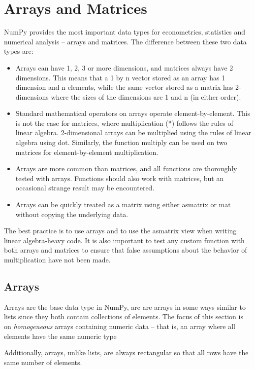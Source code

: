 \documentclass[KSmain.tex]{subfiles}
\begin{document}
 
\section{Arrays and Matrices}
NumPy provides the most important data types for econometrics, statistics and numerical analysis – arrays
and matrices. The difference between these two data types are:
\begin{itemize}
\item Arrays can have 1, 2, 3 or more dimensions, and matrices always have 2 dimensions. This means
that a 1 by n vector stored as an array has 1 dimension and n elements, while the same vector stored
as a matrix has 2-dimensions where the sizes of the dimensions are 1 and n (in either order).
\item  Standard mathematical operators on arrays operate element-by-element. This is not the case for
matrices, where multiplication (*) follows the rules of linear algebra. 2-dimensional arrays can be
multiplied using the rules of linear algebra using dot. Similarly, the function multiply can be used
on two matrices for element-by-element multiplication.
\item  Arrays are more common than matrices, and all functions are thoroughly tested with arrays. Functions
should also work with matrices, but an occasional strange result may be encountered.
\item  Arrays can be quickly treated as a matrix using either asmatrix or mat without copying the underlying
data.
\end{itemize}
The best practice is to use arrays and to use the asmatrix view when writing linear algebra-heavy code. It is
also important to test any custom function with both arrays and matrices to ensure that false assumptions
about the behavior of multiplication have not been made.

\subsection{Arrays}
Arrays are the base data type in NumPy, are are arrays in some ways similar to lists since they both contain
collections of elements. The focus of this section is on \textit{homogeneous} arrays containing numeric data
– that is, an array where all elements have the same numeric type


Additionally, arrays, unlike lists, are always rectangular so that all rows have the same
number of elements.
\end{document}
